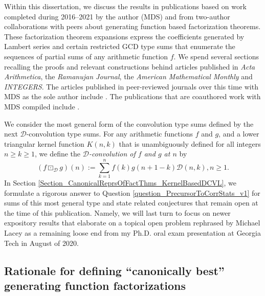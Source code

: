 \documentclass[12pt,reqno,a4letter]{article}
\numberwithin{figure}{section}
\numberwithin{table}{section}
\numberwithin{equation}{section}
\theoremstyle{plain}
\numberwithin{theorem}{section}
\theoremstyle{definition}
\begin{document}
Within this dissertation, we discuss the results in 
publications based on work completed during 2016--2021 
by the author (MDS) and from two-author collaborations with peers
about generating function based factorization theorems. 
These factorization theorem expansions express the coefficients generated by Lambert series 
and certain restricted GCD type sums that enumerate the sequences of 
partial sums of any arithmetic function $f$. 
We spend several sections recalling the proofs and relevant constructions 
behind articles published in \emph{Acta Arithmetica}, the \emph{Ramanujan Journal}, the 
\emph{American Mathematical Monthly} and \emph{INTEGERS}. 
The articles published in peer-reviewed journals over this time with MDS as the sole author 
include \cite{AA,MDS-COMBRESTRDIVSUMS-INTEGERS}. 
The publications that are coauthored work with MDS compiled include 
\cite{MDS-MERCA-AMM,MERCA-SCHMIDT-LSFACTTHM,MERCA-SCHMIDT-PN,MERCA-SCHMIDT-RAMJ,MOUSAVI-SCHMIDT-2019}. 

We consider the most general form of the convolution type sums defined by the 
next $\mathcal{D}$-convolution type sums. 
For any arithmetic functions $f$ and $g$, and a lower triangular kernel function 
$K(n, k)$ that is unambiguously defined for all integers $n \geq k \geq 1$, we define the 
\emph{$\mathcal{D}$-convolution of $f$ and $g$ at $n$} by 
\begin{equation}
\label{eqn_DCvlSummationBasedExpDefs_restated_v2-Intro_def_v1}
(f \boxdot_{\mathcal{D}} g)(n) := \sum_{k=1}^{n} f(k) g(n+1-k) \mathcal{D}(n, k), n \geq 1. 
\end{equation}
In Section \ref{Section_CanonicalReprsOfFactThms_KernelBasedDCVL}, 
we formulate a rigorous answer to 
Question \ref{question_PrecursorToCorrStats_v1} 
for sums of this most general type and state 
related conjectures that remain open at the time of this publication. 
Namely, 
we will last turn to focus on newer expository results that 
elaborate on a topical open problem rephrased by Michael Lacey 
as a remaining loose end from my Ph.D. 
oral exam presentation at Georgia Tech in August of 2020. 

\subsection{Rationale for defining ``canonically best'' 
            generating function factorizations}
\label{subSection_Intro_NotionsOfCanonicallyBest_v1}
\end{document}
